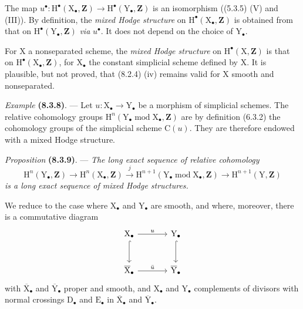\documentclass[11pt,leqno]{article}
\begin{document}
The map \(u^\bullet:\mathrm{H}^\bullet(\mathrm{X}_\bullet,\mathbf{Z})\to\mathrm{H}^\bullet(\mathrm{Y}_\bullet,\mathbf{Z})\) is an isomorphism ((5.3.5) (V) and (III)). By definition, the \textit{mixed Hodge structure} on \(\mathrm{H}^\bullet(\mathrm{X}_\bullet,\mathbf{Z})\) is obtained from that on \(\mathrm{H}^\bullet(\mathrm{Y}_\bullet,\mathbf{Z})\) \textit{via} \(u^\bullet\). It does not depend on the choice of \(\mathrm{Y}_\bullet\).

For \(\mathrm{X}\) a nonseparated scheme, the \textit{mixed Hodge structure} on \(\mathrm{H}^\bullet(\mathrm{X},\mathbf{Z})\) is that on \(\mathrm{H}^\bullet(\mathrm{X}_\bullet,\mathbf{Z})\), for \(\mathrm{X}_\bullet\) the constant simplicial scheme defined by \(\mathrm{X}\). It is plausible, but not proved, that (8.2.4) (iv) remains valid for \(\mathrm{X}\) smooth and nonseparated.

\textit{Example} \textbf{(8.3.8)}. — Let \(u:\mathrm{X}_\bullet\to\mathrm{Y}_\bullet\) be a morphism of simplicial schemes. The relative cohomology groups \(\mathrm{H}^n(\mathrm{Y}_\bullet\operatorname{mod}\mathrm{X}_\bullet,\mathbf{Z})\) are by definition (6.3.2) the cohomology groups of the simplicial scheme \(\mathrm{C}(u)\). They are therefore endowed with a mixed Hodge structure.

\textit{Proposition} \textbf{(8.3.9)}. — \textit{The long exact sequence of relative cohomology}
\[
\mathrm{H}^n(\mathrm{Y}_\bullet,\mathbf{Z})
\to\mathrm{H}^n(\mathrm{X}_\bullet,\mathbf{Z})
\xrightarrow{j}
\mathrm{H}^{n+1}(\mathrm{Y}_\bullet\operatorname{mod}\mathrm{X}_\bullet,\mathbf{Z})
\to\mathrm{H}^{n+1}(\mathrm{Y},\mathbf{Z})
\]
\textit{is a long exact sequence of mixed Hodge structures.}

We reduce to the case where \(\mathrm{X}_\bullet\) and \(\mathrm{Y}_\bullet\) are smooth, and where, moreover, there is a commutative diagram
\[
\begin{tikzcd}[column sep=large,row sep=large]
\mathrm{X}_\bullet \arrow[r,"u"] \arrow[d,hook]
 & \mathrm{Y}_\bullet \arrow[d,hook]\\
\overline{\mathrm{X}}_\bullet \arrow[r,"\bar{u}"]
 & \overline{\mathrm{Y}}_\bullet
\end{tikzcd}
\]
with \(\overline{\mathrm{X}}_\bullet\) and \(\overline{\mathrm{Y}}_\bullet\) proper and smooth, and \(\mathrm{X}_\bullet\) and \(\mathrm{Y}_\bullet\) complements of divisors with normal crossings \(\mathrm{D}_\bullet\) and \(\mathrm{E}_\bullet\) in \(\overline{\mathrm{X}}_\bullet\) and \(\overline{\mathrm{Y}}_\bullet\).
\end{document}
